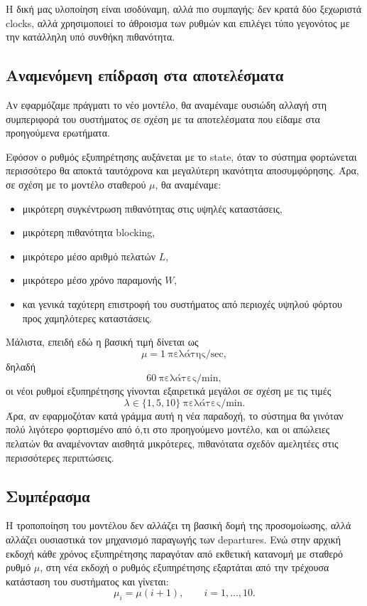 \documentclass{article}
\begin{document}
Η δική μας υλοποίηση είναι ισοδύναμη, αλλά πιο συμπαγής: δεν κρατά δύο ξεχωριστά clocks, αλλά χρησιμοποιεί το άθροισμα των ρυθμών και επιλέγει τύπο γεγονότος με την κατάλληλη υπό συνθήκη πιθανότητα.

\subsection{Αναμενόμενη επίδραση στα αποτελέσματα}

Αν εφαρμόζαμε πράγματι το νέο μοντέλο, θα αναμέναμε ουσιώδη αλλαγή στη συμπεριφορά του συστήματος σε σχέση με τα αποτελέσματα που είδαμε στα προηγούμενα ερωτήματα.

Εφόσον ο ρυθμός εξυπηρέτησης αυξάνεται με το state, όταν το σύστημα φορτώνεται περισσότερο θα αποκτά ταυτόχρονα και μεγαλύτερη ικανότητα αποσυμφόρησης. Άρα, σε σχέση με το μοντέλο σταθερού $\mu$, θα αναμέναμε:

\begin{itemize}
    \item μικρότερη συγκέντρωση πιθανότητας στις υψηλές καταστάσεις,
    \item μικρότερη πιθανότητα blocking,
    \item μικρότερο μέσο αριθμό πελατών $L$,
    \item μικρότερο μέσο χρόνο παραμονής $W$,
    \item και γενικά ταχύτερη επιστροφή του συστήματος από περιοχές υψηλού φόρτου προς χαμηλότερες καταστάσεις.
\end{itemize}

Μάλιστα, επειδή εδώ η βασική τιμή δίνεται ως
\[
\mu = 1 \ \text{πελάτης/sec},
\]
δηλαδή
\[
60 \ \text{πελάτες/min},
\]
οι νέοι ρυθμοί εξυπηρέτησης γίνονται εξαιρετικά μεγάλοι σε σχέση με τις τιμές
\[
\lambda \in \{1,5,10\} \ \text{πελάτες/min}.
\]
Άρα, αν εφαρμοζόταν κατά γράμμα αυτή η νέα παραδοχή, το σύστημα θα γινόταν πολύ λιγότερο φορτισμένο από ό,τι στο προηγούμενο μοντέλο, και οι απώλειες πελατών θα αναμένονταν αισθητά μικρότερες, πιθανότατα σχεδόν αμελητέες στις περισσότερες περιπτώσεις.

\subsection{Συμπέρασμα}

Η τροποποίηση του μοντέλου δεν αλλάζει τη βασική δομή της προσομοίωσης, αλλά αλλάζει ουσιαστικά τον μηχανισμό παραγωγής των departures. Ενώ στην αρχική εκδοχή κάθε χρόνος εξυπηρέτησης παραγόταν από εκθετική κατανομή με σταθερό ρυθμό $\mu$, στη νέα εκδοχή ο ρυθμός εξυπηρέτησης εξαρτάται από την τρέχουσα κατάσταση του συστήματος και γίνεται:
\[
\mu_i=\mu(i+1), \qquad i=1,\ldots,10.
\]
\end{document}
